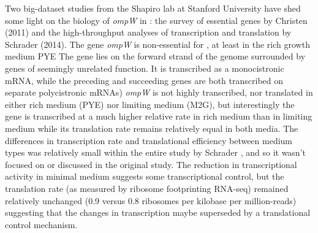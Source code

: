 Two big-dataset studies from the Shapiro lab at Stanford University have shed some light on the biology of \textit{ompW} in \caulobacter: the survey of essential genes by Christen \etal (2011) and the high-throughput analyses of transcription and translation by Schrader \etal (2014). The gene \textit{ompW} is non-essential for \caulobacter, at least in the rich growth medium \ac{PYE} The gene lies on the forward strand of the genome surrounded by genes of seemingly unrelated function. It is transcribed as a monocistronic mRNA, while the preceding and succeeding genes are both transcribed on separate polycistronic mRNAs) \textit{ompW} is not highly transcribed, nor translated in either rich medium (\ac{PYE}) nor limiting medium (M2G), but interestingly the gene is transcribed at a much higher relative rate in rich medium than in limiting medium while its translation rate remains relatively equal in both media. The differences in transcription rate and translational efficiency between medium types was relatively small within the entire study by Schrader \etal, and so it wasn't focused on or discussed in the original study. The reduction in transcriptional activity in minimal medium suggests some transcriptional control, but the translation rate (as measured by ribosome footprinting RNA-seq) remained relatively unchanged (0.9 versus 0.8 ribosomes per kilobase per million-reads) suggesting that the changes in transcription maybe superseded by a translational control mechanism.

